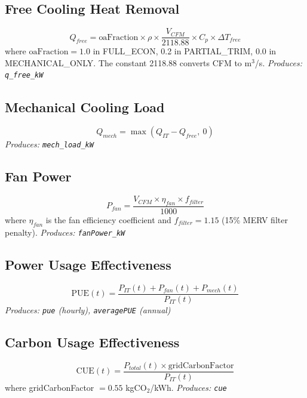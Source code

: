 \documentclass[12pt,a4paper]{report}
\begin{document}
\subsection{Free Cooling Heat Removal}
\begin{equation}
Q_{free} = \text{oaFraction} \times \rho \times \frac{V_{CFM}}{2118.88} \times C_p \times \Delta T_{free}
\label{eq:q_free}
\end{equation}
where $\text{oaFraction} = 1.0$ in FULL\_ECON, 0.2 in PARTIAL\_TRIM, 0.0 in MECHANICAL\_ONLY.
The constant 2118.88 converts CFM to m$^3$/s. \textit{Produces: \texttt{q\_free\_kW}}

\subsection{Mechanical Cooling Load}
\begin{equation}
Q_{mech} = \max(Q_{IT} - Q_{free},\ 0)
\label{eq:q_mech}
\end{equation}
\textit{Produces: \texttt{mech\_load\_kW}}

\subsection{Fan Power}
\begin{equation}
P_{fan} = \frac{V_{CFM} \times \eta_{fan} \times f_{filter}}{1000}
\label{eq:fan_power}
\end{equation}
where $\eta_{fan}$ is the fan efficiency coefficient and $f_{filter} = 1.15$ (15\% MERV filter penalty).
\textit{Produces: \texttt{fanPower\_kW}}

\subsection{Power Usage Effectiveness}
\begin{equation}
\text{PUE}(t) = \frac{P_{IT}(t) + P_{fan}(t) + P_{mech}(t)}{P_{IT}(t)}
\label{eq:pue}
\end{equation}
\textit{Produces: \texttt{pue} (hourly), \texttt{averagePUE} (annual)}

\subsection{Carbon Usage Effectiveness}
\begin{equation}
\text{CUE}(t) = \frac{P_{total}(t) \times \text{gridCarbonFactor}}{P_{IT}(t)}
\label{eq:cue}
\end{equation}
where gridCarbonFactor $= 0.55$ kgCO$_2$/kWh. \textit{Produces: \texttt{cue}}
\end{document}
